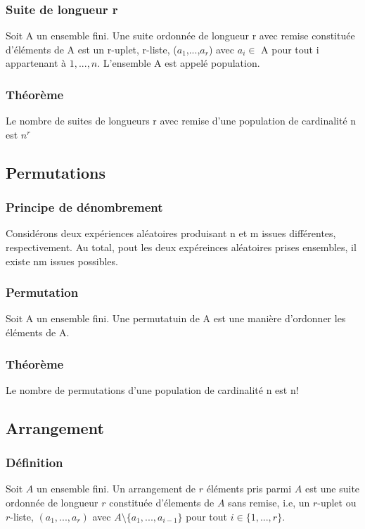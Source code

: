 \documentclass{article}
\begin{document}
            \subsubsection{Suite de longueur r}
                Soit A un ensemble fini. Une suite ordonnée de longueur r avec remise
                constituée d'éléments de A est un r-uplet, r-liste, ($a_1$,...,$a_r$)
                avec $a_i \in$ A pour tout i appartenant à ${1,...,n}$. L'ensemble A est appelé population.
            \subsubsection{Théorème}
                Le nombre de suites de longueurs r avec remise d'une population de cardinalité n est $n^r$
        \subsection{Permutations}
            \subsubsection{Principe de dénombrement}
                Considérons deux expériences aléatoires produisant n et m issues
                différentes, respectivement. Au total, pout les deux expéreinces
                aléatoires prises ensembles, il existe nm issues possibles.
            \subsubsection{Permutation}
                Soit A un ensemble fini. Une permutatuin de A est une manière
                d'ordonner les éléments de A.
            \subsubsection{Théorème}
                Le nombre de permutations d'une population de cardinalité n est n!


        \subsection{Arrangement}
            \subsubsection{Définition}
                Soit $A$ un ensemble fini. Un arrangement de $r$ éléments
                pris parmi $A$ est une suite ordonnée de longueur $r$ 
                constituée d'élements de $A$ sans remise, i.e, un $r$-uplet
                ou $r$-liste, $(a_1,...,a_r)$ avec
                $A\setminus\{a_1,...,a_{i-1}\}$ pour tout $i\in\{1,...,r\}$.
\end{document}
